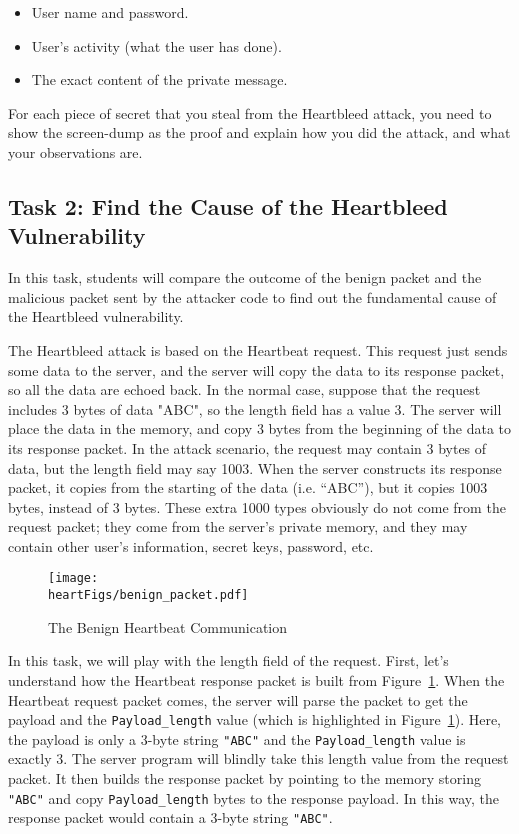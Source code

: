 \begin{itemize} 
	\item User name and password.
	\item User's activity (what the user has done).
	\item The exact content of the private message.
\end{itemize} 
  
For each piece of secret that you steal from the Heartbleed attack, you need to
show the screen-dump as the proof and explain how you did the attack, 
and what your observations are.



\subsection{Task 2: Find the Cause of the Heartbleed Vulnerability}

In this task, students will compare the outcome of the benign packet and
the malicious packet sent by the attacker code to find out the fundamental
cause of the Heartbleed vulnerability. 


The Heartbleed attack is based on the Heartbeat request. This request just
sends some data to the server, and the server will copy the data to its
response packet, so all
the data are echoed back.
In the normal case, suppose that the request includes 3 bytes of data "ABC",
so the length field has a value 3. The server will place the 
data in the memory, and copy 3 bytes from the beginning of the data to its
response packet. 
In the attack scenario, the request may contain 3 bytes of data, but 
the length field may say 1003. When the server constructs its response packet, it copies from the
starting of the data (i.e. ``ABC''), but it copies 1003 bytes, instead of 3 bytes. 
These extra 1000 types obviously do not come from the request packet; they come from the 
server's private memory, and they may contain other user's
information, secret keys, password, etc. 


\begin{figure}[htb]
\centering
\texttt{[image: \\heartFigs/benign\_packet.pdf]}
\caption{The Benign Heartbeat Communication} 
\label{fig:benign_packet}
\end{figure}

In this task, we will play with the length field of the request.
First, let's understand how the Heartbeat response packet is built from 
Figure~\ref{fig:benign_packet}. When the Heartbeat request packet comes,
the server will parse the packet to get the payload and
the \texttt{Payload\_length} value (which is highlighted in 
Figure~\ref{fig:benign_packet}). Here, the payload is only a 3-byte string
\texttt{"ABC"} and the \texttt{Payload\_length} value is exactly 3. The server program will
blindly take this length value from the request packet. It then builds
the response packet by pointing to the memory storing \texttt{"ABC"} and copy 
\texttt{Payload\_length} bytes to the response payload. In
this way, the response packet would contain a 3-byte string \texttt{"ABC"}.

